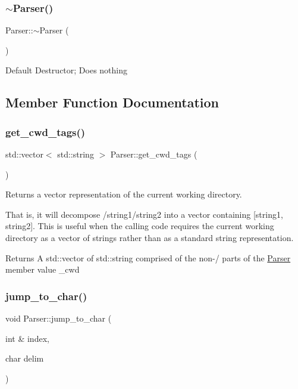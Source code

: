 \subsubsection{\texorpdfstring{$\sim$\+Parser()}{~Parser()}}
{\footnotesize\ttfamily Parser\+::$\sim$\+Parser (\begin{DoxyParamCaption}{ }\end{DoxyParamCaption})}

Default Destructor; Does nothing 

\subsection{Member Function Documentation}
\mbox{\label{class_parser_aa973764b863dfbe448fa2fd7aa9ffdaa}} 
\subsubsection{\texorpdfstring{get\+\_\+cwd\+\_\+tags()}{get\_cwd\_tags()}}
{\footnotesize\ttfamily std\+::vector$<$ std\+::string $>$ Parser\+::get\+\_\+cwd\+\_\+tags (\begin{DoxyParamCaption}{ }\end{DoxyParamCaption})}



Returns a vector representation of the current working directory. 

That is, it will decompose \textquotesingle{}/string1/string2\textquotesingle{} into a vector containing \mbox{[}string1, string2\mbox{]}. This is useful when the calling code requires the current working directory as a vector of strings rather than as a standard string representation.

\begin{DoxyReturn}{Returns}
A std\+::vector of std\+::string comprised of the non-\/\textquotesingle{}/\textquotesingle{} parts of the \mbox{\hyperlink{class_parser}{Parser}} member value \+\_\+cwd 
\end{DoxyReturn}
\mbox{\label{class_parser_abc03a0e1dbb6886981f024cb3957b09a}} 
\subsubsection{\texorpdfstring{jump\+\_\+to\+\_\+char()}{jump\_to\_char()}}
{\footnotesize\ttfamily void Parser\+::jump\+\_\+to\+\_\+char (\begin{DoxyParamCaption}\item[{int \&}]{index,  }\item[{char}]{delim }\end{DoxyParamCaption})\hspace{0.3cm}{\ttfamily [private]}}



